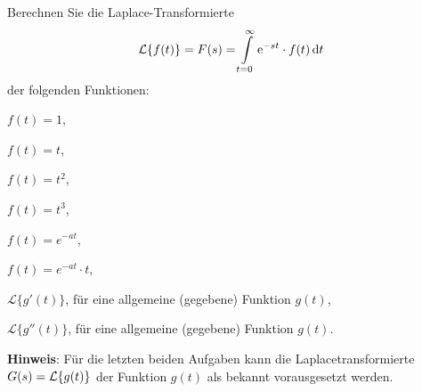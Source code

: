 {
Berechnen Sie die Laplace-Transformierte 
$$\mathcal{L}\{f(t)\}=F(s)=\int\limits_{t=0}^\infty \mathrm{e}^{-st}\cdot f(t)\, \mathrm{d}  t$$ der folgenden Funktionen: 
\begin{iii}
\begin{multicols}{2}
\item $f(t) = 1$,
\item $f(t) = t$,
\item $f(t) = t^2$,
\item $f(t) = t^3$,
\item $f(t) = e^{-at}$,
\item $f(t) = e^{-at}\cdot t$,
\item ${\mathcal L}\{g'(t)\}$, f\"ur eine allgemeine (gegebene) Funktion $g(t)$,
\item ${\mathcal L}\{g''(t)\}$, f\"ur eine allgemeine (gegebene) Funktion $g(t)$.
\end{multicols}
\end{iii}
\textbf{Hinweis}: F\"ur die letzten beiden Aufgaben kann die Laplacetransformierte $G(s)=\mathcal{L}\{g(t)\}$ der Funktion $g(t)$ als bekannt vorausgesetzt werden. 


}

